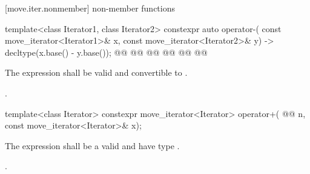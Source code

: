 [move.iter.nonmember]{ non-member functions}

%
\begin{itemdecl}
template<class Iterator1, class Iterator2>
  constexpr auto operator-(
    const move_iterator<Iterator1>& x,
    const move_iterator<Iterator2>& y) -> decltype(x.base() - y.base());
@@
@@
    @@
@@
@@
    @@
\end{itemdecl}

\begin{itemdescr}
\begin{addedblock}
\pnum
\constraints
The expression  shall be valid and
convertible to .
\end{addedblock}

\pnum
\returns {}.
\end{itemdescr}

%
\begin{itemdecl}
template<class Iterator>
  constexpr move_iterator<Iterator> operator+(
    @@ n,
    const move_iterator<Iterator>& x);
\end{itemdecl}

\begin{itemdescr}
\begin{addedblock}
\pnum
\constraints
The expression  shall be a valid and
have type .
\end{addedblock}

\pnum
\returns {}.
\end{itemdescr}

